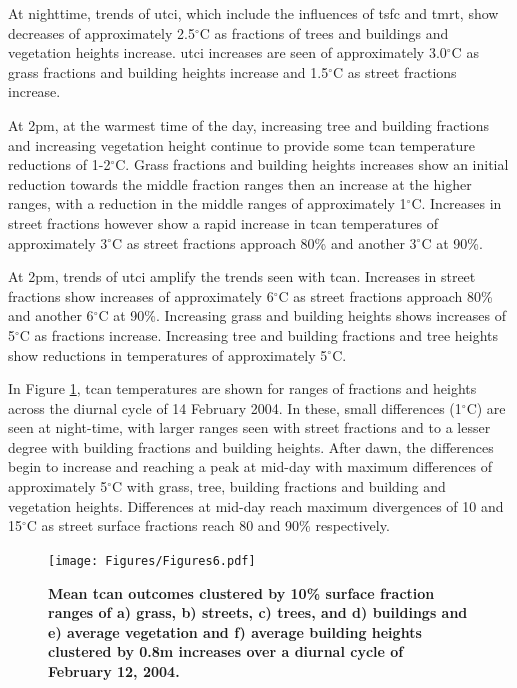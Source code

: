 \documentclass[final,3p,times,authoryear]{elsarticle}
\begin{document}
At nighttime, trends of \gls{utci}, which include the influences of \gls{tsfc} and \gls{tmrt}, show decreases of approximately 2.5$^{\circ}$C as fractions of trees and buildings and vegetation heights increase. \gls{utci} increases are seen of approximately 3.0$^{\circ}$C as grass fractions and building heights increase and 1.5$^{\circ}$C as street fractions increase.

At 2pm, at the warmest time of the day, increasing tree and building fractions and increasing vegetation height continue to provide some \gls{tcan} temperature reductions of 1-2$^{\circ}$C. Grass fractions and building heights increases show an initial reduction towards the middle fraction ranges then an increase at the higher ranges, with a reduction in the middle ranges of approximately 1$^{\circ}$C. Increases in street fractions however show a rapid increase in \gls{tcan} temperatures of approximately 3$^{\circ}$C as street fractions approach 80\% and another 3$^{\circ}$C at 90\%.

At 2pm, trends of \gls{utci} amplify the trends seen with \gls{tcan}. Increases in street fractions show increases of approximately 6$^{\circ}$C as street fractions approach 80\% and another 6$^{\circ}$C at 90\%. Increasing grass and building heights shows increases of 5$^{\circ}$C as fractions increase. Increasing tree and building fractions and tree heights show reductions in temperatures of approximately 5$^{\circ}$C.




In Figure \ref{fig:tcanday}, \gls{tcan} temperatures are shown for ranges of fractions and heights across the diurnal cycle of 14 February 2004. In these, small differences (1$^{\circ}$C) are seen at night-time, with larger ranges seen with street fractions and to a lesser degree with building fractions and building heights. After dawn, the differences begin to increase and reaching a peak at mid-day with maximum differences of approximately 5$^{\circ}$C with grass, tree, building fractions and building and vegetation heights. Differences at mid-day reach maximum divergences of 10 and 15$^{\circ}$C as street surface fractions reach 80 and 90\% respectively.

\begin{figure}
\centering
\texttt{[image: Figures/Figures6.pdf]}
\caption{\bf Mean \gls{tcan} outcomes clustered by 10\% surface fraction ranges of a) grass, b) streets, c) trees, and d) buildings and e) average vegetation and f) average building heights clustered by 0.8m increases over a diurnal cycle of February 12, 2004.  }
 \label{fig:tcanday}
\end{figure}
\end{document}
